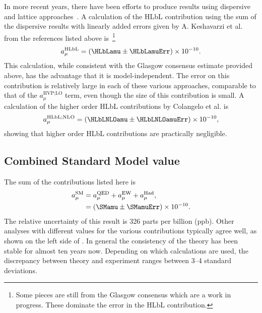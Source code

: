 In more recent years, there have been efforts to produce results using dispersive~\cite{PhysRevLett.121.112002,PhysRevD.95.054026,Hoferichter:2018kwz,Colangelo:2015ama,Colangelo:2017fiz,Colangelo:2017another,Colangelo:2019uex,Colangelo:2019lpu} and lattice approaches~\cite{Blum:2019ugy,Asmussen:2019act}. A calculation of the HLbL contribution using the sum of the dispersive results with linearly added errors given by A. Keshavarzi et al. from the references listed above is~\cite{Keshavarzi:2019abf}\footnote{Some pieces are still from the Glasgow consensus which are a work in progress. These dominate the error in the HLbL contribution.}
		\begin{align}
            a_{\mu}^{\text{HLbL}} = (\HLbLamu \pm \HLbLamuErr) \times 10^{-10}.
		\end{align}
This calculation, while consistent with the Glasgow consensus estimate provided above, has the advantage that it is model-independent. The error on this contribution is relatively large in each of these various approaches, comparable to that of the $a_{\mu}^{\text{HVP;LO}}$ term, even though the size of this contribution is small. A calculation of the higher order HLbL contributions by Colangelo et al. is~\cite{Colangelo:2014qya}
		\begin{align}
            a_{\mu}^{\text{HLbL;NLO}} = (\HLbLNLOamu \pm \HLbLNLOamuErr) \times 10^{-10},
		\end{align}
showing that higher order HLbL contributions are practically negligible.





\subsection{Combined Standard Model value}

The sum of the \amu contributions listed here is~\cite{Kinoshita1,Kinoshita2,Ishikawa:2018rlv,Keshavarzi:2019abf,Kurz:2014wya,Nyffeler:2016gnb,Colangelo:2014qya}
		\begin{equation}
		\begin{aligned}
            a_{\mu}^{\text{SM}} &= a_{\mu}^{\text{QED}} + a_{\mu}^{\text{EW}} + a_{\mu}^{\text{Had}}, \\
			&= (\SMamu \pm \SMamuErr) \times 10^{-10}.
		\end{aligned}
		\end{equation}
The relative uncertainty of this result is 326 parts per billion (ppb). Other analyses with different values for the various contributions typically agree well, as shown on the left side of . In general the consistency of the theory has been stable for almost ten years now. Depending on which calculations are used, the discrepancy between theory and experiment ranges between \SIrange{3}{4}{} standard deviations. 


